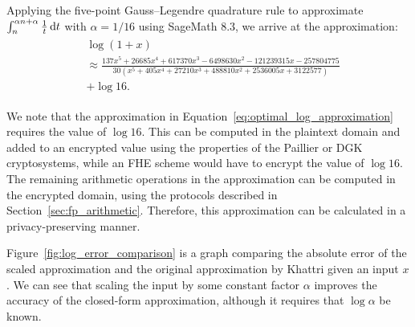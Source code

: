 Applying the five-point Gauss--Legendre quadrature rule to approximate $\int_{n}^{\alpha n + \alpha}{\frac{1}{t}\mathop{}\!\mathrm{d} t}$ with $\alpha = 1/16$ using SageMath 8.3, we arrive at the approximation:
\begin{align}\label{eq:optimal_log_approximation}
	\begin{split}
		&\log\left(1+x\right) \\
		&\approx \frac{137x^5 + 26685x^4 + 617370x^3 - 6498630x^2 - 121239315x - 257804775}
		{30(x^5 + 405x^4 + 27210x^3 + 488810x^2 + 2536005x + 3122577)}\\
		&+ \log{16}.
	\end{split}
\end{align}

We note that the approximation in Equation~\ref{eq:optimal_log_approximation} requires the value of $\log{16}$. This can be computed in the plaintext domain and added to an encrypted value using the properties of the Paillier or DGK cryptosystems, while an FHE scheme would have to encrypt the value of $\log{16}$. The remaining arithmetic operations in the approximation can be computed in the encrypted domain, using the protocols described in Section~\ref{sec:fp_arithmetic}. Therefore, this approximation can be calculated in a privacy-preserving manner.

Figure~\ref{fig:log_error_comparison} is a graph comparing the absolute error of the scaled approximation and the original approximation by Khattri given an input $x$. We can see that scaling the input by some constant factor $\alpha$ improves the accuracy of the closed-form approximation, although it requires that $\log \alpha$ be known.

